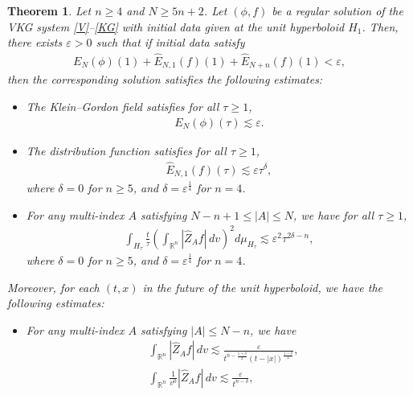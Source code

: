 \documentclass{article}
\newtheorem{theorem}{Theorem}[section]
\newcommand{\bbr}{{\mathbb R}}
\begin{document}
%
\begin{theorem} \label{thm}
Let $ n \geq 4 $ and $ N \geq 5 n + 2 $. Let $ ( \phi , f ) $ be a regular solution of the VKG system \eqref{V}--\eqref{KG} with initial data given at the unit hyperboloid $ H_1 $. Then, there exists $ \varepsilon > 0 $ such that if initial data satisfy
\begin{align*}
E_N ( \phi ) ( 1 ) + \hat{ E }_{ N, 1 } ( f ) ( 1 ) + \hat{ E }_{ N + n } ( f ) ( 1 ) < \varepsilon ,
\end{align*}
then the corresponding solution satisfies the following estimates:
\begin{itemize}
\item[1.] The Klein--Gordon field satisfies for all $ \tau \geq 1 $,
\begin{align}
E_N ( \phi ) ( \tau ) \lesssim \varepsilon . \label{thm1}
\end{align}
\item[2.] The distribution function satisfies for all $ \tau \geq 1 $,
\begin{align}
\hat{ E }_{ N , 1 } ( f ) ( \tau ) \lesssim \varepsilon \tau^{ \delta } , \label{thm2}
\end{align}
where $ \delta = 0 $ for $ n \geq 5 $, and $ \delta = \varepsilon^{ \frac14 } $ for $ n = 4 $.
\item[3.] For any multi-index $ A $ satisfying $ N - n + 1 \leq | A | \leq N $, we have for all $ \tau \geq 1 $,
\begin{align}
\int_{ H_\tau } \frac{ t }{ \tau } \left( \int_{ \bbr^n } | \hat{ Z }_A f | \, d v \right)^2 d \mu_{ H_\tau } \lesssim \varepsilon^2 \tau^{ 2 \delta - n } , \label{thm3}
\end{align}
where $ \delta = 0 $ for $ n \geq 5 $, and $ \delta = \varepsilon^{ \frac14 } $ for $ n = 4 $.
\end{itemize}
Moreover, for each $ ( t , x ) $ in the future of the unit hyperboloid, we have the following estimates:
\begin{itemize}
\item[4.] For any multi-index $ A $ satisfying $ | A | \leq N - n $, we have
\begin{align}
& \int_{ \bbr^n } | \hat{ Z }_A f | \, d v \lesssim \frac{ \varepsilon }{ t^{ n - \frac{ 1 + \delta }{ 2 } } ( t - | x | )^{ \frac{ 1 - \delta }{ 2 } } } , \label{thm41} \\
& \int_{ \bbr^n } \frac{ 1 }{ v^0 } | \hat{ Z }_A f | \, d v \lesssim \frac{ \varepsilon }{ t^{ n - \delta } } , \label{thm42}
\end{align}

\end{itemize}
\end{theorem}
\end{document}
